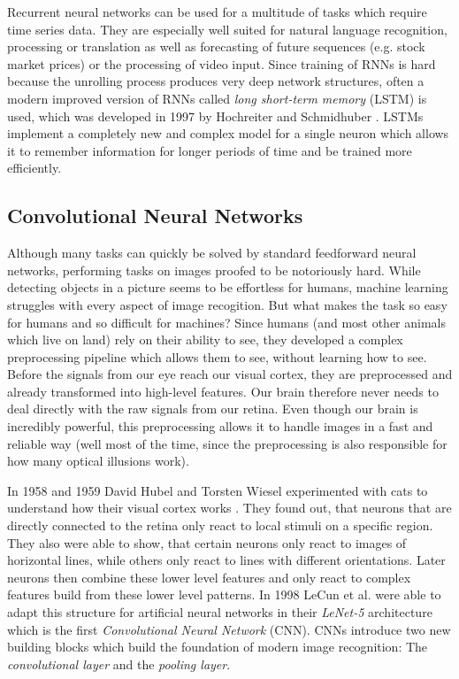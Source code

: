 Recurrent neural networks can be used for a multitude of tasks which require time series data. They are especially well suited for natural language recognition, processing or translation as well as forecasting of future sequences (e.g. stock market prices) or the processing of video input. Since training of RNNs is hard because the unrolling process produces very deep network structures, often a modern improved version of RNNs called \textit{long short-term memory} (LSTM) is used, which was developed in 1997 by Hochreiter and Schmidhuber \cite{hochreiter1997long}. LSTMs implement a completely new and complex model for a single neuron which allows it to remember information for longer periods of time and be trained more efficiently.


\subsection{Convolutional Neural Networks} \label{ssec:CNNs}
Although many tasks can quickly be solved by standard feedforward neural networks, performing tasks on images proofed to be notoriously hard. While detecting objects in a picture seems to be effortless for humans, machine learning struggles with every aspect of image recogition. But what makes the task so easy for humans and so difficult for machines? Since humans (and most other animals which live on land) rely on their ability to see, they developed a complex preprocessing pipeline which allows them to see, without learning how to see. Before the signals from our eye reach our visual cortex, they are preprocessed and already transformed into high-level features. Our brain therefore never needs to deal directly with the raw signals from our retina. Even though our brain is incredibly powerful, this preprocessing allows it to handle images in a fast and reliable way (well most of the time, since the preprocessing is also responsible for how many optical illusions work). 

In 1958 and 1959 David Hubel and Torsten Wiesel experimented with cats to understand how their visual cortex works \cite{hubel1959single, hubel1959receptive}. They found out, that neurons that are directly connected to the retina only react to local stimuli on a specific region. They also were able to show, that certain neurons only react to images of horizontal lines, while others only react to lines with different orientations. Later neurons then combine these lower level features and only react to complex features build from these lower level patterns. In 1998 LeCun et al. were able to adapt this structure for artificial neural networks in their \textit{LeNet-5} architecture \cite{lecun1998gradient} which is the first \textit{Convolutional Neural Network} (CNN). CNNs introduce two new building blocks which build the foundation of modern image recognition: The \textit{convolutional layer} and the \textit{pooling layer}.

